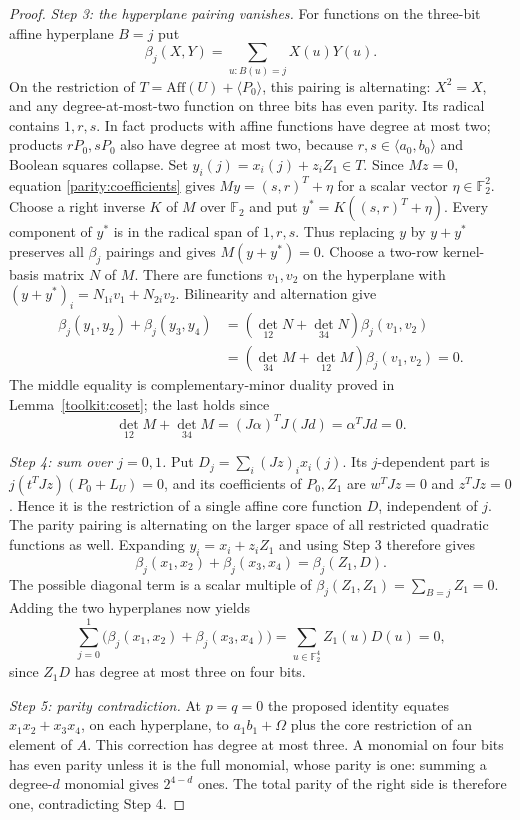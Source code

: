 \documentclass[11pt,a4paper]{article}
\theoremstyle{plain}
\theoremstyle{remark}
\newcommand{\F}{\mathbb F_2}
\newcommand{\Aff}{\mathrm{Aff}}
\begin{document}
\begin{proof}
\emph{Step 3: the hyperplane pairing vanishes.}
For functions on the three-bit affine hyperplane $B=j$ put
\[
\beta_j(X,Y)=\sum_{u:B(u)=j}X(u)Y(u).
\]
On the restriction of $T=\Aff(U)+\langle P_0\rangle$, this pairing is alternating: $X^2=X$, and any degree-at-most-two function on three bits has even parity. Its radical contains $1,r,s$. In fact products with affine functions have degree at most two; products $rP_0,sP_0$ also have degree at most two, because $r,s\in\langle a_0,b_0\rangle$ and Boolean squares collapse.
Set $y_i(j)=x_i(j)+z_iZ_1\in T$. Since $Mz=0$, equation \eqref{parity:coefficients} gives $My=(s,r)^T+\eta$ for a scalar vector $\eta\in\F^2$. Choose a right inverse $K$ of $M$ over $\F$ and put $y^*=K((s,r)^T+\eta)$. Every component of $y^*$ is in the radical span of $1,r,s$. Thus replacing $y$ by $y+y^*$ preserves all $\beta_j$ pairings and gives $M(y+y^*)=0$.
Choose a two-row kernel-basis matrix $N$ of $M$. There are functions $v_1,v_2$ on the hyperplane with $(y+y^*)_i=N_{1i}v_1+N_{2i}v_2$. Bilinearity and alternation give
\begin{align*}
\beta_j(y_1,y_2)+\beta_j(y_3,y_4)
&=(\det_{12}N+\det_{34}N)\beta_j(v_1,v_2)\\
&=(\det_{34}M+\det_{12}M)\beta_j(v_1,v_2)=0.
\end{align*}
The middle equality is complementary-minor duality proved in Lemma~\ref{toolkit:coset}; the last holds since
\[
\det_{12}M+\det_{34}M=(J\alpha)^TJ(Jd)=\alpha^TJd=0.
\]

\emph{Step 4: sum over $j=0,1$.}
Put $D_j=\sum_i(Jz)_ix_i(j)$. Its $j$-dependent part is $j(t^TJz)(P_0+L_U)=0$, and its coefficients of $P_0,Z_1$ are $w^TJz=0$ and $z^TJz=0$. Hence it is the restriction of a single affine core function $D$, independent of $j$.
The parity pairing is alternating on the larger space of all restricted quadratic functions as well. Expanding $y_i=x_i+z_iZ_1$ and using Step 3 therefore gives
\[
\beta_j(x_1,x_2)+\beta_j(x_3,x_4)=\beta_j(Z_1,D).
\]
The possible diagonal term is a scalar multiple of $\beta_j(Z_1,Z_1)=\sum_{B=j}Z_1=0$. Adding the two hyperplanes now yields
\[
\sum_{j=0}^1\bigl(\beta_j(x_1,x_2)+\beta_j(x_3,x_4)\bigr)
=\sum_{u\in\F^4}Z_1(u)D(u)=0,
\]
since $Z_1D$ has degree at most three on four bits.

\emph{Step 5: parity contradiction.}
At $p=q=0$ the proposed identity equates $x_1x_2+x_3x_4$, on each hyperplane, to $a_1b_1+\Omega$ plus the core restriction of an element of $A$. This correction has degree at most three. A monomial on four bits has even parity unless it is the full monomial, whose parity is one: summing a degree-$d$ monomial gives $2^{4-d}$ ones. The total parity of the right side is therefore one, contradicting Step 4.


\end{proof}
\end{document}
